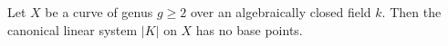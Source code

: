 Let $X$ be a curve of genus $g \geqslant 2$ over an algebraically closed field $k$. Then the canonical linear system $|K|$ on $X$ has no base points.
